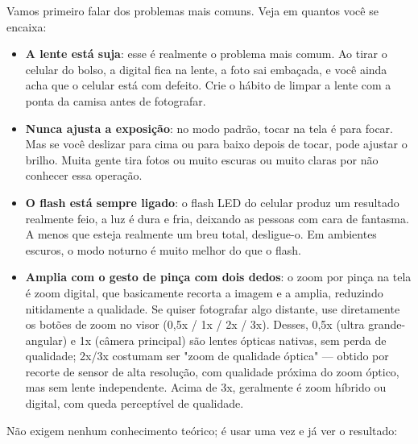 


Vamos primeiro falar dos problemas mais comuns. Veja em quantos você se encaixa:

\begin{itemize}
  \item \textbf{A lente está suja}: esse é realmente o problema mais comum. Ao tirar o celular do bolso, a digital fica na lente, a foto sai embaçada, e você ainda acha que o celular está com defeito. Crie o hábito de limpar a lente com a ponta da camisa antes de fotografar.
  \item \textbf{Nunca ajusta a exposição}: no modo padrão, tocar na tela é para focar. Mas se você deslizar para cima ou para baixo depois de tocar, pode ajustar o brilho. Muita gente tira fotos ou muito escuras ou muito claras por não conhecer essa operação.
  \item \textbf{O flash está sempre ligado}: o flash LED do celular produz um resultado realmente feio, a luz é dura e fria, deixando as pessoas com cara de fantasma. A menos que esteja realmente um breu total, desligue-o. Em ambientes escuros, o modo noturno é muito melhor do que o flash.
  \item \textbf{Amplia com o gesto de pinça com dois dedos}: o zoom por pinça na tela é zoom digital, que basicamente recorta a imagem e a amplia, reduzindo nitidamente a qualidade. Se quiser fotografar algo distante, use diretamente os botões de zoom no visor (0,5x / 1x / 2x / 3x). Desses, 0,5x (ultra grande-angular) e 1x (câmera principal) são lentes ópticas nativas, sem perda de qualidade; 2x/3x costumam ser "zoom de qualidade óptica" — obtido por recorte de sensor de alta resolução, com qualidade próxima do zoom óptico, mas sem lente independente. Acima de 3x, geralmente é zoom híbrido ou digital, com queda perceptível de qualidade.
\end{itemize}


Não exigem nenhum conhecimento teórico; é usar uma vez e já ver o resultado:

